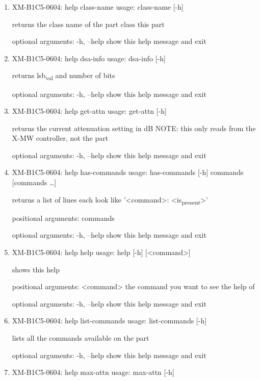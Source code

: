 \documentclass[11pt]{article}
\begin{document}
\begin{enumerate}
\item XM-B1C5-0604: help class-name
\label{sec:org8804bbe}
usage: class-name [-h]

returns the class name of the part class this part

optional arguments:
  -h, --help  show this help message and exit

\item XM-B1C5-0604: help dsa-info
\label{sec:org76d7d50}
usage: dsa-info [-h]

returns lsb\textsubscript{val} and number of bits

optional arguments:
  -h, --help  show this help message and exit

\item XM-B1C5-0604: help get-attn
\label{sec:orgfdf54f2}
usage: get-attn [-h]

returns the current attenuation setting in dB NOTE: this only reads from the
X-MW controller, not the part

optional arguments:
  -h, --help  show this help message and exit

\item XM-B1C5-0604: help has-commands
\label{sec:orgd37d4ae}
usage: has-commands [-h] commands [commands \ldots{}]

returns a list of lines each look like '<command>: <is\textsubscript{present}>'

positional arguments:
  commands

optional arguments:
  -h, --help  show this help message and exit

\item XM-B1C5-0604: help help
\label{sec:org1e78b82}
usage: help [-h] [<command>]

shows this help

positional arguments:
  <command>   the command you want to see the help of

optional arguments:
  -h, --help  show this help message and exit

\item XM-B1C5-0604: help list-commands
\label{sec:org885dd94}
usage: list-commands [-h]

lists all the commands available on the part

optional arguments:
  -h, --help  show this help message and exit

\item XM-B1C5-0604: help max-attn
\label{sec:orgad897be}
usage: max-attn [-h]


\end{enumerate}
\end{document}
